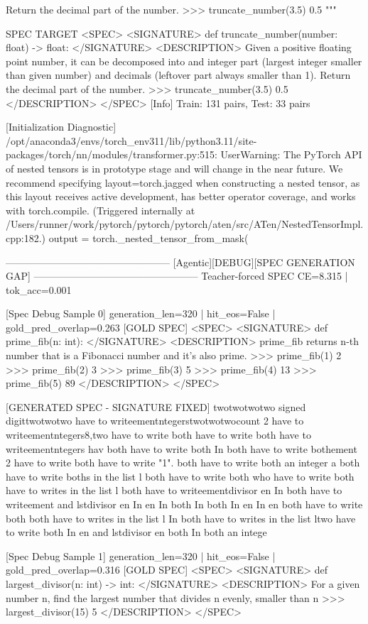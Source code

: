 Return the decimal part of the number.
>>> truncate_number(3.5)
0.5
"""


SPEC TARGET
<SPEC> <SIGNATURE> def truncate_number(number: float) -> float: </SIGNATURE> <DESCRIPTION> Given a positive floating point number, it can be decomposed into and integer part (largest integer smaller than given number) and decimals (leftover part always smaller than 1). Return the decimal part of the number. >>> truncate_number(3.5) 0.5 </DESCRIPTION> </SPEC>
[Info] Train: 131 pairs, Test: 33 pairs

[Initialization Diagnostic]
/opt/anaconda3/envs/torch_env311/lib/python3.11/site-packages/torch/nn/modules/transformer.py:515: UserWarning: The PyTorch API of nested tensors is in prototype stage and will change in the near future. We recommend specifying layout=torch.jagged when constructing a nested tensor, as this layout receives active development, has better operator coverage, and works with torch.compile. (Triggered internally at /Users/runner/work/pytorch/pytorch/pytorch/aten/src/ATen/NestedTensorImpl.cpp:182.)
output = torch._nested_tensor_from_mask(

--------------------------------------------------
[Agentic][DEBUG][SPEC GENERATION GAP]
--------------------------------------------------
Teacher-forced SPEC CE=8.315 | tok_acc=0.001

[Spec Debug Sample 0]
generation_len=320 | hit_eos=False | gold_pred_overlap=0.263
[GOLD SPEC]
<SPEC> <SIGNATURE> def prime_fib(n: int): </SIGNATURE> <DESCRIPTION> prime_fib returns n-th number that is a Fibonacci number and it's also prime. >>> prime_fib(1) 2 >>> prime_fib(2) 3 >>> prime_fib(3) 5 >>> prime_fib(4) 13 >>> prime_fib(5) 89 </DESCRIPTION> </SPEC>

[GENERATED SPEC - SIGNATURE FIXED]
twotwotwotwo signed digittwotwotwo have to writeementntegerstwotwotwocount 2 have to writeementntegers8,two have to write both have to write both have to writeementntegers hav both have to write both In both have to write bothement 2 have to write both have to write "1". both have to write both an integer a both have to write boths in the list l both have to write both who have to write both have to writes in the list l both have to writeementdivisor en In both have to writeement and lstdivisor en In en In both In both In en In en both have to write both both have to writes in the list l In both have to writes in the list ltwo have to write both In en and lstdivisor en both In both an intege

[Spec Debug Sample 1]
generation_len=320 | hit_eos=False | gold_pred_overlap=0.316
[GOLD SPEC]
<SPEC> <SIGNATURE> def largest_divisor(n: int) -> int: </SIGNATURE> <DESCRIPTION> For a given number n, find the largest number that divides n evenly, smaller than n >>> largest_divisor(15) 5 </DESCRIPTION> </SPEC>

